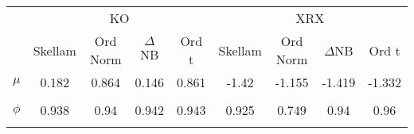 \begin{footnotesize}
\tabcolsep=0.07cm
\begin{singlespace}
\begin{tabular}{ccccccccc} \toprule 
 & \multicolumn{4}{c}{KO}& \multicolumn{4}{c}{XRX} \\ 
\cmidrule(r){2-5} \cmidrule(r){6-9} &  \multicolumn{1}{c}{Skellam}&  \multicolumn{1}{c}{Ord Norm}&  \multicolumn{1}{c}{$\Delta$NB}&  \multicolumn{1}{c}{Ord t}&  \multicolumn{1}{c}{Skellam}&  \multicolumn{1}{c}{Ord Norm}&  \multicolumn{1}{c}{$\Delta$NB}&  \multicolumn{1}{c}{Ord t} \\ \midrule
$ \mu $ & 0.182 & 0.864 & 0.146 & 0.861 & -1.42 & -1.155 & -1.419 & -1.332 \\ 
 & \begin{tiny} [0.141,0.224] \end{tiny}  & \begin{tiny} [0.82,0.908] \end{tiny}  & \begin{tiny} [0.106,0.189] \end{tiny}  & \begin{tiny} [0.816,0.906] \end{tiny}  & \begin{tiny} [-1.474,-1.364] \end{tiny}  & \begin{tiny} [-1.202,-1.107] \end{tiny}  & \begin{tiny} [-1.474,-1.364] \end{tiny}  & \begin{tiny} [-1.405,-1.26] \end{tiny}  \\ 
$ \phi $ & 0.938 & 0.94 & 0.942 & 0.943 & 0.925 & 0.749 & 0.94 & 0.96 \\ 
 & \begin{tiny} [0.932,0.944] \end{tiny}  & \begin{tiny} [0.934,0.945] \end{tiny}  & \begin{tiny} [0.937,0.948] \end{tiny}  & \begin{tiny} [0.938,0.949] \end{tiny}  & \begin{tiny} [0.909,0.94] \end{tiny}  & \begin{tiny} [0.718,0.779] \end{tiny}  & \begin{tiny} [0.928,0.952] \end{tiny}  & \begin{tiny} [0.949,0.97] \end{tiny}  \\ 

\end{tabular}
\end{singlespace}
\end{footnotesize}
